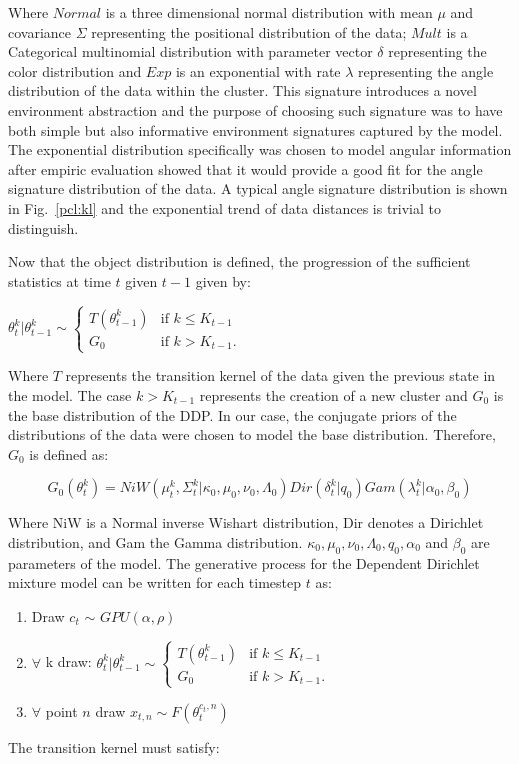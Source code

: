\documentclass[twoside,hidelinks]{article}
\begin{document}
Where $Normal$ is a three dimensional normal distribution with mean $\mu$ and covariance $\Sigma$ representing the positional distribution of the data; $Mult$ is a Categorical multinomial distribution with parameter vector $\delta$ representing the color distribution and $Exp$ is an exponential with rate $\lambda$ representing the angle distribution of the data within the cluster. This signature introduces a novel environment abstraction and the purpose of choosing such signature was to have both simple but also informative environment signatures captured by the model. The exponential distribution specifically  was chosen to model angular information after empiric evaluation showed that it would provide a good fit for the angle signature distribution of the data. A typical angle signature distribution is shown in Fig.~\ref{pcl:kl} and the exponential trend of data distances is trivial to distinguish.

Now that the object distribution is defined, the progression of the sufficient statistics at time $t$ given $t-1$ given by:


\begin{center}
 $\theta_t^k | \theta_{t-1}^k \sim
\begin{cases} T (\theta_{t-1}^k) &\mbox{if } k \leq K_{t-1} \\
G_0 & \mbox{if } k > K_{t-1}. \end{cases}$
\end{center}

Where $T$ represents the transition kernel of the data given the previous state in the model. The case $ k > K_{t-1} $ represents the creation of a new cluster and $G_0$ is the base distribution of the DDP. In our case, the conjugate priors of the distributions of the data were chosen to model the base distribution. Therefore, $G_0$ is defined as:

$$ G_0(\theta_t^k)  = NiW( \mu_t^k, \Sigma_t^k | \kappa_0, \mu_0, \nu_0, \Lambda_0 ) Dir(\delta_t^k | q_0) Gam( \lambda_t^k | \alpha_0, \beta_0) $$

Where NiW is a Normal inverse Wishart distribution, Dir denotes a Dirichlet distribution, and Gam the Gamma distribution. $ \kappa_0, \mu_0, \nu_0, \Lambda_0, q_0,\alpha_0$ and $\beta_0$ are parameters of the model. The generative process for the Dependent Dirichlet mixture model can be written for each timestep $t$ as:

\noindent\makebox[\linewidth]{\rule{\textwidth}{0.4pt}}
\begin{enumerate}
	\item Draw  $c_t$ $\sim$ $GPU(\alpha, \rho) $
	\item $\forall$  k draw: $ \theta_t^k | \theta_{t-1}^k \sim
	\begin{cases} T (\theta_{t-1}^k) &\mbox{if } k \leq K_{t-1} \\
	G_0 & \mbox{if } k > K_{t-1}. \end{cases}$
	\item $\forall$  point $n$ draw $ x_{t,n} \sim F(\theta_t^{c_t,n})$
\end{enumerate}
\noindent\makebox[\linewidth]{\rule{\textwidth}{0.4pt}}
The transition kernel must satisfy\cite{caron}:
\end{document}
